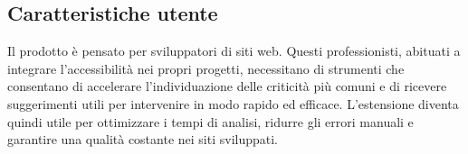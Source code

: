 
\subsection{Caratteristiche utente}
Il prodotto è pensato per sviluppatori di siti web.
Questi professionisti, abituati a integrare l'accessibilità nei propri progetti, necessitano di strumenti che consentano di accelerare l'individuazione delle criticità più comuni e di ricevere suggerimenti utili per intervenire in modo rapido ed efficace.
L'estensione diventa quindi utile per ottimizzare i tempi di analisi, ridurre gli errori manuali e garantire una qualità costante nei siti sviluppati.